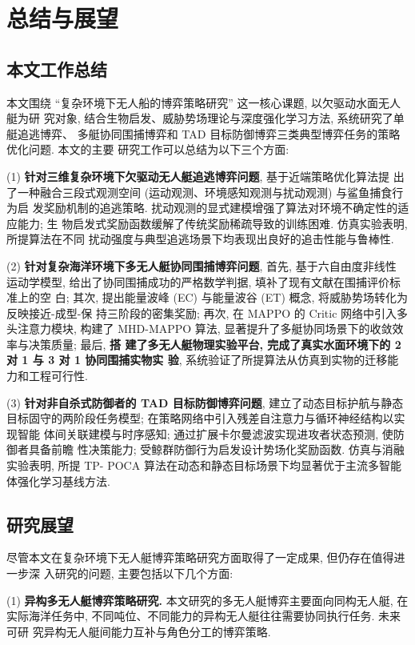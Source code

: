 \chapter{总结与展望}
\label{cha:conclusion}

\section{本文工作总结}
本文围绕 ``复杂环境下无人船的博弈策略研究'' 这一核心课题, 以欠驱动水面无人艇为研
究对象, 结合生物启发、威胁势场理论与深度强化学习方法, 系统研究了单艇追逃博弈、
多艇协同围捕博弈和 TAD 目标防御博弈三类典型博弈任务的策略优化问题. 本文的主要
研究工作可以总结为以下三个方面:

(1) \textbf{针对三维复杂环境下欠驱动无人艇追逃博弈问题}, 基于近端策略优化算法提
出了一种融合三段式观测空间 (运动观测、环境感知观测与扰动观测) 与鲨鱼捕食行为启
发奖励机制的追逃策略. 扰动观测的显式建模增强了算法对环境不确定性的适应能力; 生
物启发式奖励函数缓解了传统奖励稀疏导致的训练困难. 仿真实验表明, 所提算法在不同
扰动强度与典型追逃场景下均表现出良好的追击性能与鲁棒性.

(2) \textbf{针对复杂海洋环境下多无人艇协同围捕博弈问题}, 首先, 基于六自由度非线性
运动学模型, 给出了协同围捕成功的严格数学判据, 填补了现有文献在围捕评价标准上的空
白; 其次, 提出能量波峰 (EC) 与能量波谷 (ET) 概念, 将威胁势场转化为反映接近-成型-保
持三阶段的密集奖励; 再次, 在 MAPPO 的 Critic 网络中引入多头注意力模块, 构建了
MHD-MAPPO 算法, 显著提升了多艇协同场景下的收敛效率与决策质量; 最后, \textbf{搭
建了多无人艇物理实验平台, 完成了真实水面环境下的 2 对 1 与 3 对 1 协同围捕实物实
验}, 系统验证了所提算法从仿真到实物的迁移能力和工程可行性.

(3) \textbf{针对非自杀式防御者的 TAD 目标防御博弈问题}, 建立了动态目标护航与静态
目标固守的两阶段任务模型; 在策略网络中引入残差自注意力与循环神经结构以实现智能
体间关联建模与时序感知; 通过扩展卡尔曼滤波实现进攻者状态预测, 使防御者具备前瞻
性决策能力; 受鲸群防御行为启发设计势场化奖励函数. 仿真与消融实验表明, 所提 TP-
POCA 算法在动态和静态目标场景下均显著优于主流多智能体强化学习基线方法.

\section{研究展望}
尽管本文在复杂环境下无人艇博弈策略研究方面取得了一定成果, 但仍存在值得进一步深
入研究的问题, 主要包括以下几个方面:

(1) \textbf{异构多无人艇博弈策略研究.} 本文研究的多无人艇博弈主要面向同构无人艇,
在实际海洋任务中, 不同吨位、不同能力的异构无人艇往往需要协同执行任务. 未来可研
究异构无人艇间能力互补与角色分工的博弈策略.

